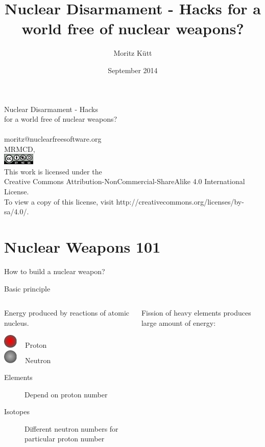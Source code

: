 \documentclass[presentation]{beamer}
\author{Moritz Kütt}
\date{September 2014}
\title{Nuclear Disarmament - Hacks for a world free of nuclear weapons?}
\makeatletter
\renewcommand{\maketitle}{\begin{frame}\begin{center}\Large
\vspace{1.5cm}
Nuclear Disarmament - Hacks\\ for a world free of nuclear weapons?\\[0.5em]\small\insertauthor\\[1em]\tiny moritz@nuclearfreesoftware.org\\[1em]
MRMCD, \insertdate\\[0.5em]
\vspace{1.8cm} \includegraphics[width=1.5cm]{by-nc-sa_eu.png}\\\fontsize{5pt}{6}\selectfont \textcolor{gray!85}{This work is licensed under the\\ Creative Commons Attribution-NonCommercial-ShareAlike 4.0 International License.\\ To view a copy of this license, visit http://creativecommons.org/licenses/by-sa/4.0/.}
\end{center}\end{frame}}
\def\s@out@end{\relax\relax\relax}
\def\s@out#1\s@out@end{\sout{#1}}
\def\makestrikeout<#1>#2{\only<#1>{\s@out}#2\s@out@end}
\makeatother
\begin{document}
\maketitle

\section{Nuclear Weapons 101}
\label{sec-1}
\begin{frame}[label=sec-1-1]{}
\begin{center}
\makestrikeout<2>{How to build a nuclear weapon?}\\[1em]
\end{center}
\end{frame}

\begin{frame}[label=sec-1-2]{Basic principle}
\begin{columns}
\begin{column}{0.45\textwidth}
Energy produced by reactions of atomic nucleus.

\begin{varblock}[\textwidth]{}
\includegraphics[width=0.1\textwidth]{images/proton} ~ Proton \\[0.5em]
\includegraphics[width=0.1\textwidth]{images/neutron} ~ Neutron
\end{varblock}

\footnotesize

\begin{description}
\item[{Elements}] Depend on proton number
\item[{Isotopes}] Different neutron numbers for particular proton number
\end{description}
\end{column}

\begin{column}{0.45\textwidth}

Fission of heavy elements produces large amount of energy:


\end{column}
\end{columns}
\end{frame}
\end{document}
